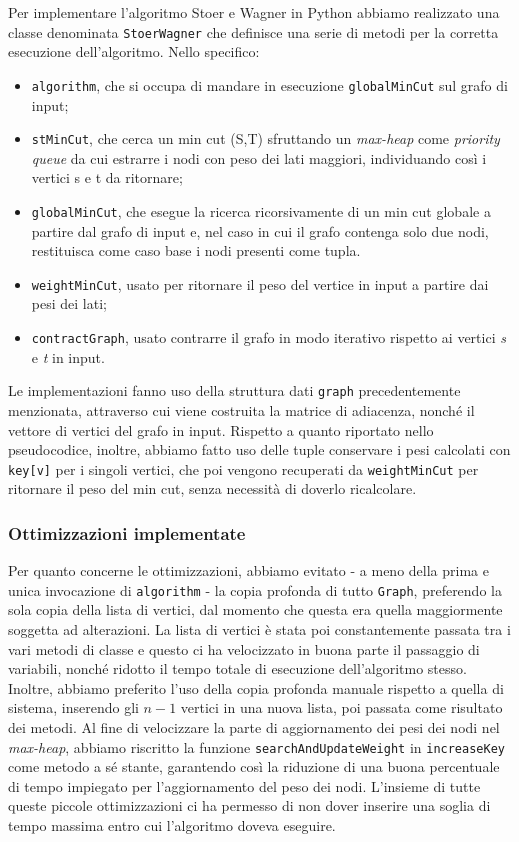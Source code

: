 Per implementare l'algoritmo Stoer e Wagner in Python abbiamo realizzato una classe denominata \texttt{StoerWagner} che definisce una serie di metodi per la corretta esecuzione dell'algoritmo.
Nello specifico: 

\begin{itemize}
    \item \texttt{algorithm}, che si occupa di mandare in esecuzione \texttt{globalMinCut} sul grafo di input;
    \item \texttt{stMinCut}, che cerca un min cut (S,T) sfruttando un \textit{max-heap} come \textit{priority queue} da cui estrarre i nodi con peso dei lati maggiori, individuando così i vertici s e t da ritornare;
    \item \texttt{globalMinCut}, che esegue la ricerca ricorsivamente di un min cut globale a partire dal grafo di input e, nel caso in cui il grafo contenga solo due nodi, restituisca come caso base i nodi presenti come tupla.
    \item \texttt{weightMinCut}, usato per ritornare il peso del vertice in input a partire dai pesi dei lati;
    \item \texttt{contractGraph}, usato contrarre il grafo in modo iterativo rispetto ai vertici \textit{s} e \textit{t} in input. 
\end{itemize}

Le implementazioni fanno uso della struttura dati \texttt{graph} precedentemente menzionata, attraverso cui viene costruita la matrice di adiacenza, nonché il vettore di vertici del grafo in input. Rispetto a quanto riportato nello pseudocodice, inoltre, abbiamo fatto uso delle tuple conservare i pesi calcolati con \texttt{key[v]} per i singoli vertici, che poi vengono recuperati da \texttt{weightMinCut} per ritornare il peso del min cut, senza necessità di doverlo ricalcolare.

\subsubsection{Ottimizzazioni implementate}

Per quanto concerne le ottimizzazioni, abbiamo evitato - a meno della prima e unica invocazione di \texttt{algorithm} - la copia profonda di tutto \texttt{Graph}, preferendo la sola copia della lista di vertici, dal momento che questa era quella maggiormente soggetta ad alterazioni. La lista di vertici è stata poi constantemente passata tra i vari metodi di classe e questo ci ha velocizzato in buona parte il passaggio di variabili, nonché ridotto il tempo totale di esecuzione dell'algoritmo stesso. Inoltre, abbiamo preferito l'uso della copia profonda manuale rispetto a quella di sistema, inserendo gli \(n-1\) vertici in una nuova lista, poi passata come risultato dei metodi. 
Al fine di velocizzare la parte di aggiornamento dei pesi dei nodi nel \textit{max-heap}, abbiamo riscritto la funzione \texttt{searchAndUpdateWeight} in \texttt{increaseKey} come metodo a sé stante, garantendo così la riduzione di una buona percentuale di tempo impiegato per l'aggiornamento del peso dei nodi.
L'insieme di tutte queste piccole ottimizzazioni ci ha permesso di non dover inserire una soglia di tempo massima entro cui l'algoritmo doveva eseguire.